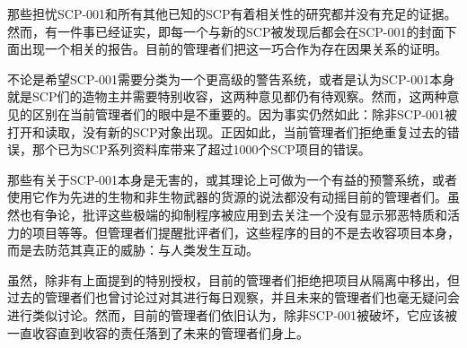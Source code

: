 那些担忧SCP-001和所有其他已知的SCP有着相关性的研究都并没有充足的证据。然而，有一件事已经证实，即每一个与新的SCP被发现后都会在SCP-001的封面下面出现一个相关的报告。目前的管理者们把这一巧合作为存在因果关系的证明。

不论是希望SCP-001需要分类为一个更高级的警告系统，或者是认为SCP-001本身就是SCP们的造物主并需要特别收容，这两种意见都仍有待观察。然而，这两种意见的区别在当前管理者们的眼中是不重要的。因为事实仍然如此：除非SCP-001被打开和读取，没有新的SCP对象出现。正因如此，当前管理者们拒绝重复过去的错误，那个已为SCP系列资料库带来了超过1000个SCP项目的错误。

那些有关于SCP-001本身是无害的，或其理论上可做为一个有益的预警系统，或者使用它作为先进的生物和非生物武器的货源的说法都没有动摇目前的管理者们。虽然也有争论，批评这些极端的抑制程序被应用到去关注一个没有显示邪恶特质和活力的项目等等。但管理者们提醒批评者们，这些程序的目的不是去收容项目本身，而是去防范其真正的威胁：与人类发生互动。

虽然，除非有上面提到的特别授权，目前的管理者们拒绝把项目从隔离中移出，但过去的管理者们也曾讨论过对其进行每日观察，并且未来的管理者们也毫无疑问会进行类似讨论。然而，目前的管理者们依旧认为，除非SCP-001被破坏，它应该被一直收容直到收容的责任落到了未来的管理者们身上。

